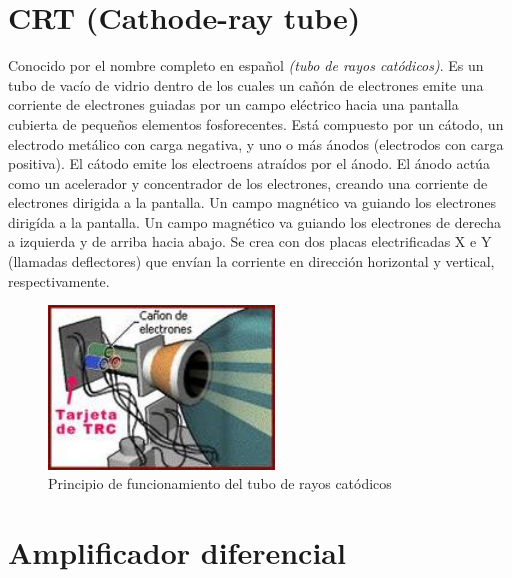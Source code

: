 \documentclass[letterpaper, 12pt]{article}
\begin{document}
\begin{justify}
        \section{CRT (Cathode-ray tube)}
        Conocido por el nombre completo en español \emph{(tubo de rayos catódicos)}. Es un tubo de vacío de vidrio dentro de los cuales un cañón de electrones emite una corriente de electrones guiadas por un campo eléctrico hacia una pantalla cubierta de pequeños elementos
        fosforecentes. Está compuesto por un cátodo, un electrodo metálico con carga negativa, y uno o más ánodos (electrodos con carga positiva). El cátodo emite los electroens atraídos por el ánodo. El ánodo actúa como un acelerador y concentrador de los electrones, creando
        una corriente de electrones dirigida a la pantalla. Un campo magnético va guiando los electrones dirigída a la pantalla. Un campo magnético va guiando los electrones de derecha a izquierda y de arriba hacia abajo. Se crea con dos placas electrificadas X e Y (llamadas deflectores)
        que envían la corriente en dirección horizontal y vertical, respectivamente.
        \begin{figure}[H]
            \centering
            \includegraphics[width=6cm]{ctr.jpeg}
            \caption{Principio de funcionamiento del tubo de rayos catódicos}
            \label{fig:ctr}
        \end{figure}
        \section{Amplificador diferencial}

\end{justify}
\end{document}
